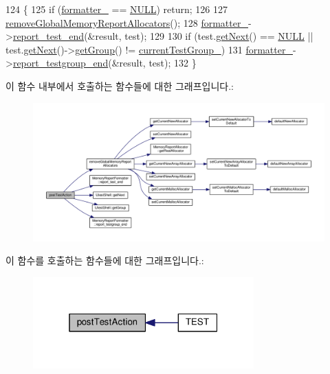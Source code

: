 \begin{DoxyCode}
124 \{
125     \textcolor{keywordflow}{if} (\hyperlink{class_memory_reporter_plugin_a09aec3af9ca6c3c27226a1aaaea13987}{formatter\_} == \hyperlink{openavb__types__base__pub_8h_a070d2ce7b6bb7e5c05602aa8c308d0c4}{NULL}) \textcolor{keywordflow}{return};
126 
127     \hyperlink{class_memory_reporter_plugin_ad599e1a65e36647a13aaccacace96328}{removeGlobalMemoryReportAllocators}();
128     \hyperlink{class_memory_reporter_plugin_a09aec3af9ca6c3c27226a1aaaea13987}{formatter\_}->\hyperlink{class_memory_report_formatter_ace6fc7f4a7c7cb5d702018d91d85ae62}{report\_test\_end}(&result, test);
129 
130     \textcolor{keywordflow}{if} (test.\hyperlink{class_utest_shell_a1ac818ddaedf486843c68a5852de42ff}{getNext}() == \hyperlink{openavb__types__base__pub_8h_a070d2ce7b6bb7e5c05602aa8c308d0c4}{NULL} || test.\hyperlink{class_utest_shell_a1ac818ddaedf486843c68a5852de42ff}{getNext}()->\hyperlink{class_utest_shell_a9d203c5f3c7cb6d28b66189a20735dca}{getGroup}() != 
      \hyperlink{class_memory_reporter_plugin_a4733051c1386e53d8d11c6b35922dbc7}{currentTestGroup\_})
131         \hyperlink{class_memory_reporter_plugin_a09aec3af9ca6c3c27226a1aaaea13987}{formatter\_}->\hyperlink{class_memory_report_formatter_aa6b20dc53db478226037eaac7ae7b49e}{report\_testgroup\_end}(&result, test);
132 \}
\end{DoxyCode}


이 함수 내부에서 호출하는 함수들에 대한 그래프입니다.\+:
\nopagebreak
\begin{figure}[H]
\begin{center}
\leavevmode
\includegraphics[width=350pt]{class_memory_reporter_plugin_a488f8809f966fc52513ee74afa87cda3_cgraph}
\end{center}
\end{figure}




이 함수를 호출하는 함수들에 대한 그래프입니다.\+:
\nopagebreak
\begin{figure}[H]
\begin{center}
\leavevmode
\includegraphics[width=241pt]{class_memory_reporter_plugin_a488f8809f966fc52513ee74afa87cda3_icgraph}
\end{center}
\end{figure}


